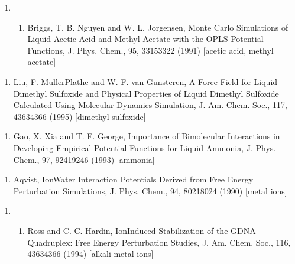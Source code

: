 \documentclass[letterpaper,11pt,english]{sphinxmanual}
\begin{document}
\begin{enumerate}
%
\setcounter{enumi}{9}
\item {} \begin{enumerate}
%
\setcounter{enumii}{12}
\item {} 
Briggs, T. B. Nguyen and W. L. Jorgensen, Monte Carlo Simulations of Liquid Acetic Acid and Methyl Acetate with the OPLS Potential Functions, J. Phys. Chem., 95, 3315\sphinxhyphen{}3322 (1991)  {[}acetic acid, methyl acetate{]}

\end{enumerate}

\end{enumerate}
\begin{enumerate}
%
\setcounter{enumi}{7}
\item {} 
Liu, F. Muller\sphinxhyphen{}Plathe and W. F. van Gunsteren, A Force Field for Liquid Dimethyl Sulfoxide and Physical Properties of Liquid Dimethyl Sulfoxide Calculated Using Molecular Dynamics Simulation, J. Am. Chem. Soc., 117, 4363\sphinxhyphen{}4366 (1995)  {[}dimethyl sulfoxide{]}

\end{enumerate}
\begin{enumerate}
%
\setcounter{enumi}{9}
\item {} 
Gao, X. Xia and T. F. George, Importance of Bimolecular Interactions in Developing Empirical Potential Functions for Liquid Ammonia, J. Phys. Chem., 97, 9241\sphinxhyphen{}9246 (1993)  {[}ammonia{]}

\end{enumerate}
\begin{enumerate}
%
\setcounter{enumi}{9}
\item {} 
Aqvist, Ion\sphinxhyphen{}Water Interaction Potentials Derived from Free Energy Perturbation Simulations, J. Phys. Chem., 94, 8021\sphinxhyphen{}8024 (1990)  {[}metal ions{]}

\end{enumerate}
\begin{enumerate}
%
\setcounter{enumi}{22}
\item {} \begin{enumerate}
%
\setcounter{enumii}{18}
\item {} 
Ross and C. C. Hardin, Ion\sphinxhyphen{}Induced Stabilization of the G\sphinxhyphen{}DNA Quadruplex: Free Energy Perturbation Studies, J. Am. Chem. Soc., 116, 4363\sphinxhyphen{}4366 (1994)  {[}alkali metal ions{]}

\end{enumerate}

\end{enumerate}
\end{document}
